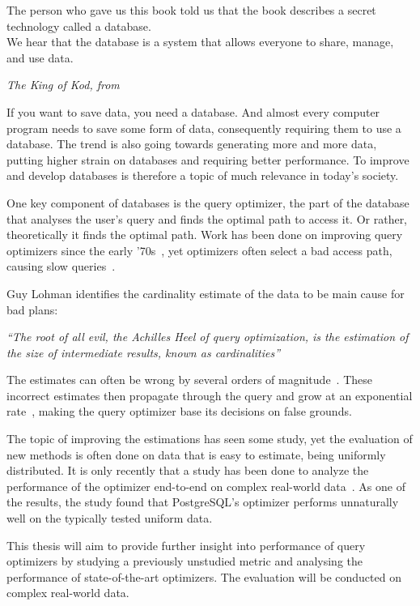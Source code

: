 \epigraph{The person who gave us this book told us that the book describes a
  secret technology called a database.\\
  We hear that the database is a system that allows everyone to share, manage,
  and use data.}{\textit{The King of Kod, from~\cite[p.~6]{takahashi_2009_manga_tmgtd}}}

If you want to save data, you need a database. And almost every computer program
needs to save some form of data, consequently requiring them to use a database.
The trend is also going towards generating more and more data, putting higher
strain on databases and requiring better performance. To improve and develop
databases is therefore a topic of much relevance in today's society.

One key component of databases is the query optimizer, the part of the database
that analyses the user's query and finds the optimal path to access it. Or
rather, theoretically it finds the optimal path. Work has been done on improving
query optimizers since the early '70s~\cite{chaudhuri_1998_overview_aooqoirs},
yet optimizers often select a bad access path, causing slow
queries~\cite{leis_2015_how_hgaqor}.

Guy Lohman identifies the cardinality estimate of the data to be main cause for bad plans:

\textit{``The root of all evil, the Achilles Heel of query optimization, is the
  estimation of the size of intermediate results, known as cardinalities''}

The estimates can often be wrong by several orders of
magnitude~\cite{lohman_query_iqoap}. These incorrect estimates then propagate
through the query and grow at an exponential
rate~\cite{ioannidis_1991_propagation_otpoeitsojr}, making the query optimizer
base its decisions on false grounds.

The topic of improving the estimations has seen some study, yet the evaluation
of new methods is often done on data that is easy to estimate, being uniformly
distributed. It is only recently that a study has been done to analyze the
performance of the optimizer end-to-end on complex real-world
data~\cite{leis_2015_how_hgaqor}. As one of the results, the study found that
PostgreSQL's optimizer performs unnaturally well on the typically tested uniform
data.

This thesis will aim to provide further insight into performance of
query optimizers by studying a previously unstudied metric and analysing the
performance of state-of-the-art optimizers. The evaluation will be conducted on
complex real-world data.

